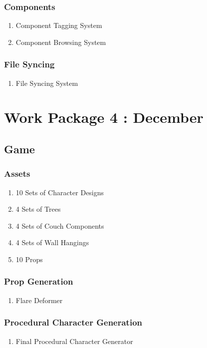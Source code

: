 \subsubsection{Components}
\begin{enumerate}
\item Component Tagging System
\item Component Browsing System
\end{enumerate}
\subsubsection{File Syncing}
\begin{enumerate}
\item File Syncing System
\end{enumerate}


\section{Work Package 4 : December}
\subsection{Game}
\subsubsection{Assets}
\begin{enumerate}
\item 10 Sets of Character Designs
\item 4 Sets of Trees
\item 4 Sets of Couch Components
\item 4 Sets of Wall Hangings
\item 10 Props
\end{enumerate}
\subsubsection{Prop Generation}
\begin{enumerate}
\item Flare Deformer
\end{enumerate}
\subsubsection{Procedural Character Generation}
\begin{enumerate}
\item Final Procedural Character Generator
\end{enumerate}
